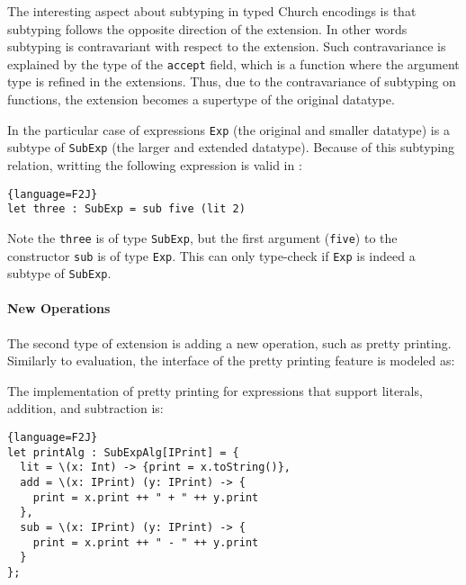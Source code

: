 The interesting aspect about subtyping in typed Church encodings is
that subtyping follows the opposite direction of the extension.  In
other words subtyping is contravariant with respect to the
extension. Such contravariance is explained by the type of the 
\lstinline{accept} field, which is a function where the argument type 
is refined in the extensions. Thus, due to the contravariance of
subtyping on functions, the extension becomes a supertype of the
original datatype. 

In the particular case of expressions \lstinline{Exp} (the original and smaller
datatype) is a subtype of \lstinline{SubExp} (the larger and extended
datatype). Because of this subtyping relation, writting the following
expression is valid in \name:

\begin{lstlisting}{language=F2J}
let three : SubExp = sub five (lit 2)
\end{lstlisting}

\noindent Note the \lstinline{three} is of type \lstinline{SubExp},
but the first argument (\lstinline{five}) to the constructor
\lstinline{sub} is of type \lstinline{Exp}. This can only type-check
if \lstinline{Exp} is indeed a subtype of \lstinline{SubExp}.





\paragraph{New Operations}
The second type of extension is adding a new operation, such as pretty printing.
Similarly to evaluation, the interface of the pretty printing feature
is modeled as:
\begin{comment}
  \begin{lstlisting}{language=F2J}
    type IPrint = {print : String};
  \end{lstlisting}
\end{comment}
The implementation of pretty printing for expressions that support literals,
addition, and subtraction is:

\begin{lstlisting}{language=F2J}
let printAlg : SubExpAlg[IPrint] = {
  lit = \(x: Int) -> {print = x.toString()},
  add = \(x: IPrint) (y: IPrint) -> {
    print = x.print ++ " + " ++ y.print
  },
  sub = \(x: IPrint) (y: IPrint) -> {
    print = x.print ++ " - " ++ y.print
  }
};
\end{lstlisting}

